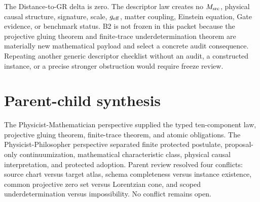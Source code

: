 \documentclass[11pt]{article}
\theoremstyle{definition}
\theoremstyle{plain}
\begin{document}
The Distance-to-GR delta is zero. The descriptor law creates no $M_{\rm src}$,
physical causal structure, signature, scale, $g_{\rm eff}$, matter coupling,
Einstein equation, Gate evidence, or benchmark status. B2 is not frozen in
this packet because the projective gluing theorem and finite-trace
underdetermination theorem are materially new mathematical payload and select
a concrete audit consequence. Repeating another generic descriptor checklist
without an audit, a constructed instance, or a precise stronger obstruction
would require freeze review.

\section{Parent-child synthesis}

The Physicist-Mathematician perspective supplied the typed ten-component law,
projective gluing theorem, finite-trace theorem, and atomic obligations. The
Physicist-Philosopher perspective separated finite protected postulate,
proposal-only continuumization, mathematical characteristic class, physical
causal interpretation, and protected adoption. Parent review resolved four
conflicts: source chart versus target atlas, schema completeness versus
instance existence, common projective zero set versus Lorentzian cone, and
scoped underdetermination versus impossibility. No conflict remains open.
\end{document}
